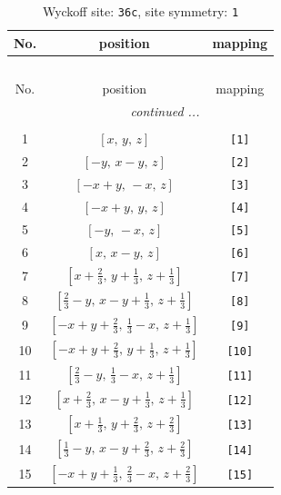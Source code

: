 \documentclass[fleqn,8pt]{jsarticle}
\begin{document}
\renewcommand{\arraystretch}{1.2}
\begin{longtable}{ccc}
\caption{Wyckoff site: {\tt 36c}, site symmetry: {\tt 1}}
 \\
 \hline \hline
No. & position & mapping \\ \hline \endfirsthead

\multicolumn{2}{l}{\tablename\ \thetable{}} \\
 \hline \hline
No. & position & mapping \\ \hline \endhead

 \hline \hline
\multicolumn{2}{r}{\footnotesize\it continued ...} \\ \endfoot

 \hline \hline
\multicolumn{2}{r}{} \\ \endlastfoot

1 & $\left[ x,\, y,\, z \right]$ & {\tt [1]} \\ \hline
2 & $\left[ - y,\, x - y,\, z \right]$ & {\tt [2]} \\ \hline
3 & $\left[ - x + y,\, - x,\, z \right]$ & {\tt [3]} \\ \hline
4 & $\left[ - x + y,\, y,\, z \right]$ & {\tt [4]} \\ \hline
5 & $\left[ - y,\, - x,\, z \right]$ & {\tt [5]} \\ \hline
6 & $\left[ x,\, x - y,\, z \right]$ & {\tt [6]} \\ \hline
7 & $\left[ x + \frac{2}{3},\, y + \frac{1}{3},\, z + \frac{1}{3} \right]$ & {\tt [7]} \\ \hline
8 & $\left[ \frac{2}{3} - y,\, x - y + \frac{1}{3},\, z + \frac{1}{3} \right]$ & {\tt [8]} \\ \hline
9 & $\left[ - x + y + \frac{2}{3},\, \frac{1}{3} - x,\, z + \frac{1}{3} \right]$ & {\tt [9]} \\ \hline
10 & $\left[ - x + y + \frac{2}{3},\, y + \frac{1}{3},\, z + \frac{1}{3} \right]$ & {\tt [10]} \\ \hline
11 & $\left[ \frac{2}{3} - y,\, \frac{1}{3} - x,\, z + \frac{1}{3} \right]$ & {\tt [11]} \\ \hline
12 & $\left[ x + \frac{2}{3},\, x - y + \frac{1}{3},\, z + \frac{1}{3} \right]$ & {\tt [12]} \\ \hline
13 & $\left[ x + \frac{1}{3},\, y + \frac{2}{3},\, z + \frac{2}{3} \right]$ & {\tt [13]} \\ \hline
14 & $\left[ \frac{1}{3} - y,\, x - y + \frac{2}{3},\, z + \frac{2}{3} \right]$ & {\tt [14]} \\ \hline
15 & $\left[ - x + y + \frac{1}{3},\, \frac{2}{3} - x,\, z + \frac{2}{3} \right]$ & {\tt [15]} \\ \hline

\end{longtable}
\end{document}
